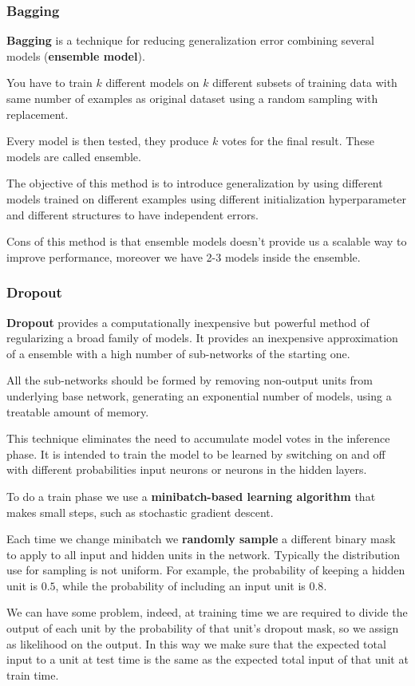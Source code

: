 \subsubsection{Bagging}
\textbf{Bagging} is a technique for reducing generalization error combining
several models (\textbf{ensemble model}).

You have to train $k$ different models on $k$ different subsets of training data
with same number of examples as original dataset using a random sampling with
replacement.

Every model is then tested, they produce $k$ votes for the final result. These
models are called ensemble.

The objective of this method is to introduce generalization by using different
models trained on different examples using different initialization hyperparameter
and different structures to have independent errors.

Cons of this method is that ensemble models doesn't provide us a scalable way to
improve performance, moreover we have 2-3 models inside the ensemble.
\subsubsection{Dropout}
\textbf{Dropout} provides a computationally inexpensive but powerful method of
regularizing a broad family of models. It provides an inexpensive approximation
of a ensemble with a high number of sub-networks of the starting one.

All the sub-networks should be formed by removing non-output units from underlying
base network, generating an exponential number of models, using a treatable
amount of memory.

This technique eliminates the need to accumulate model votes in the inference
phase. It is intended to train the model to be learned by switching on and off
with different probabilities input neurons or neurons in the hidden layers.

To do a train phase we use a \textbf{minibatch-based learning algorithm} that
makes small steps, such as stochastic gradient descent.

Each time we change minibatch we \textbf{randomly sample} a different binary mask
to apply to all input and hidden units in the network. Typically the distribution
use for sampling is not uniform. For example, the probability of keeping a hidden
unit is $0.5$, while the probability of including an input unit is $0.8$.

We can have some problem, indeed, at training time we are required to divide the
output of each unit by the probability of that unit's dropout mask, so we assign
as likelihood on the output. In this way we make sure that the expected total
input to a unit at test time is the same as the expected total input of that unit
at train time.


